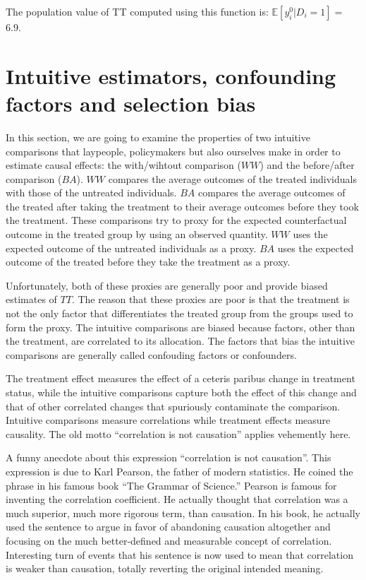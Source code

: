 \documentclass[]{book}
\newcommand{\esp}[1]{\mathbb{E}[ #1 ]}
\theoremstyle{definition}
\theoremstyle{definition}
\theoremstyle{definition}
\theoremstyle{remark}
\let\BeginKnitrBlock\begin \let\EndKnitrBlock\end
\begin{document}
The population value of TT computed using this function is: \(\esp{y_i^0|D_i=1}=\) 6.9.

\hypertarget{intuitive-estimators-confounding-factors-and-selection-bias}{%
\section{Intuitive estimators, confounding factors and selection bias}\label{intuitive-estimators-confounding-factors-and-selection-bias}}

In this section, we are going to examine the properties of two intuitive comparisons that laypeople, policymakers but also ourselves make in order to estimate causal effects: the with/wihtout comparison (\(WW\)) and the before/after comparison (\(BA\)).
\(WW\) compares the average outcomes of the treated individuals with those of the untreated individuals.
\(BA\) compares the average outcomes of the treated after taking the treatment to their average outcomes before they took the treatment.
These comparisons try to proxy for the expected counterfactual outcome in the treated group by using an observed quantity.
\(WW\) uses the expected outcome of the untreated individuals as a proxy.
\(BA\) uses the expected outcome of the treated before they take the treatment as a proxy.

Unfortunately, both of these proxies are generally poor and provide biased estimates of \(TT\).
The reason that these proxies are poor is that the treatment is not the only factor that differentiates the treated group from the groups used to form the proxy.
The intuitive comparisons are biased because factors, other than the treatment, are correlated to its allocation.
The factors that bias the intuitive comparisons are generally called confouding factors or confounders.

The treatment effect measures the effect of a ceteris paribus change in treatment status, while the intuitive comparisons capture both the effect of this change and that of other correlated changes that spuriously contaminate the comparison.
Intuitive comparisons measure correlations while treatment effects measure causality.
The old motto ``correlation is not causation'' applies vehemently here.

\BeginKnitrBlock{remark}
\iffalse{} {Remark. } \fi{}A funny anecdote about this expression ``correlation is not causation''.
This expression is due to Karl Pearson, the father of modern statistics.
He coined the phrase in his famous book ``The Grammar of Science.''
Pearson is famous for inventing the correlation coefficient.
He actually thought that correlation was a much superior, much more rigorous term, than causation.
In his book, he actually used the sentence to argue in favor of abandoning causation altogether and focusing on the much better-defined and measurable concept of correlation.
Interesting turn of events that his sentence is now used to mean that correlation is weaker than causation, totally reverting the original intended meaning.
\EndKnitrBlock{remark}
\end{document}
